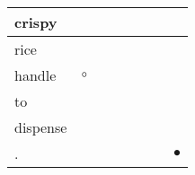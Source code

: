 \documentclass[landscape]{article}
\newcommand{\ssp}{\hspace{2pt}}
\newcommand{\mex}{\cellcolor{g}$\bullet$}
\newcommand{\map}{\cellcolor{y}$\boldsymbol\circ$}
\begin{document}
\begin{tabular}{|l|p{10pt}|p{10pt}|p{10pt}|p{10pt}|p{10pt}|p{10pt}|p{10pt}|}
\hline
\ssp crispy \ssp&\hspace{2pt}&\hspace{2pt}&\hspace{2pt}&\hspace{2pt}&\hspace{2pt}&\hspace{2pt}&\hspace{2pt}\\
\hline
\ssp rice \ssp&\hspace{2pt}&\hspace{2pt}&\hspace{2pt}&\hspace{2pt}&\hspace{2pt}&\hspace{2pt}&\hspace{2pt}\\
\hline
\ssp \cellcolor{ref0}handle \ssp&\hspace{2pt}\map&\hspace{2pt}&\hspace{2pt}&\hspace{2pt}&\hspace{2pt}&\hspace{2pt}&\hspace{2pt}\\
\hline
\ssp to \ssp&\hspace{2pt}&\hspace{2pt}&\hspace{2pt}&\hspace{2pt}&\hspace{2pt}&\hspace{2pt}&\hspace{2pt}\\
\hline
\ssp dispense \ssp&\hspace{2pt}&\hspace{2pt}&\hspace{2pt}&\hspace{2pt}&\hspace{2pt}&\hspace{2pt}&\hspace{2pt}\\
\hline
\ssp \cellcolor{ref6}. \ssp&\hspace{2pt}&\hspace{2pt}&\hspace{2pt}&\hspace{2pt}&\hspace{2pt}&\hspace{2pt}&\hspace{2pt}\mex\\
\hline
\end{tabular}
\end{document}

